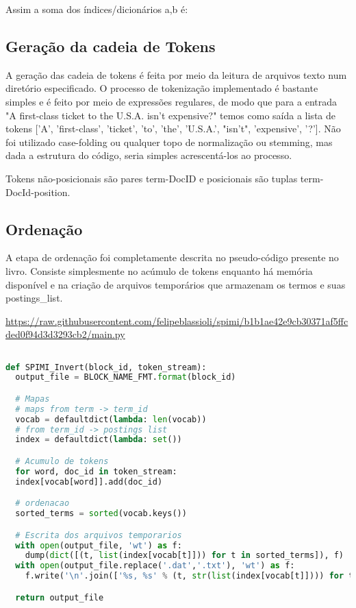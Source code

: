 \documentclass[a4paper]{article}
\begin{document}
Assim a soma dos índices/dicionários a,b é:

\subsection{Geração da cadeia de Tokens}

A geração das cadeia de tokens é feita por meio da leitura de arquivos texto num diretório especificado. O processo de tokenização implementado é bastante simples e é feito por meio de expressões regulares, de modo que para a entrada "A first-class ticket to the U.S.A. isn't expensive?"
 temos como saída a lista de tokens ['A', 'first-class', 'ticket', 'to', 'the', 'U.S.A.', "isn't", 'expensive', '?']. Não foi utilizado case-folding ou qualquer topo de normalização ou stemming, mas dada a estrutura do código, seria simples acrescentá-los ao processo.
 
Tokens não-posicionais são pares term-DocID e posicionais são tuplas term-DocId-position.
 

\subsection{Ordenação}

A etapa de ordenação foi completamente descrita no pseudo-código presente no livro. Consiste simplesmente no acúmulo de tokens enquanto há memória disponível e na criação de arquivos temporários que armazenam os termos e suas postings_list.

\url{https://raw.githubusercontent.com/felipeblassioli/spimi/b1b1ae42e9cb30371af5ffcded0f94d3d3293cb2/main.py}

\begin{lstlisting}[language=Python]  % Start your code-block

def SPIMI_Invert(block_id, token_stream):
  output_file = BLOCK_NAME_FMT.format(block_id)

  # Mapas
  # maps from term -> term_id
  vocab = defaultdict(lambda: len(vocab))  
  # from term_id -> postings list
  index = defaultdict(lambda: set())

  # Acumulo de tokens
  for word, doc_id in token_stream:
  index[vocab[word]].add(doc_id)

  # ordenacao
  sorted_terms = sorted(vocab.keys())

  # Escrita dos arquivos temporarios
  with open(output_file, 'wt') as f:
  	dump(dict([(t, list(index[vocab[t]])) for t in sorted_terms]), f)
  with open(output_file.replace('.dat','.txt'), 'wt') as f:
  	f.write('\n'.join(['%s, %s' % (t, str(list(index[vocab[t]]))) for t in sorted_terms]))

  return output_file
\end{lstlisting}
\end{document}
